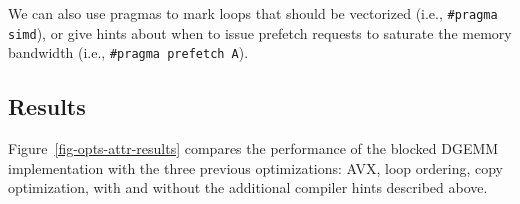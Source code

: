 We can also use pragmas to mark loops that should be vectorized (i.e.,
{\tt{\#pragma simd}}), or give hints about when to issue prefetch requests
to saturate the memory bandwidth (i.e., {\tt{\#pragma prefetch A}}).
\smallskip

\subsection{Results}



Figure~\ref{fig-opts-attr-results} compares the performance of the blocked
DGEMM implementation with the three previous optimizations: AVX, loop
ordering, copy optimization, with and without the additional compiler
hints described above.
\medskip
